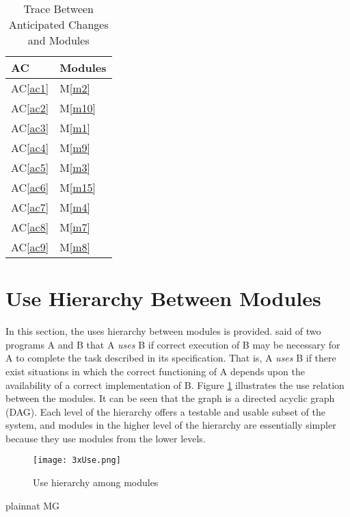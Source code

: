 \documentclass[12pt, titlepage]{article}
\newcommand{\acref}[1]{AC\ref{#1}}
\newcommand{\mref}[1]{M\ref{#1}}
\begin{document}
\begin{table}[H]
\centering
\begin{tabular}{p{} p{}}
\toprule
\textbf{AC} & \textbf{Modules}\\
\midrule
\acref{ac1} & \mref{m2}\\
\acref{ac2} & \mref{m10}\\
\acref{ac3} & \mref{m1}\\
\acref{ac4} & \mref{m9}\\
\acref{ac5} & \mref{m3}\\
\acref{ac6} & \mref{m15}\\
\acref{ac7} & \mref{m4}\\
\acref{ac8} & \mref{m7}\\
\acref{ac9} & \mref{m8}\\
\bottomrule
\end{tabular}
\caption{Trace Between Anticipated Changes and Modules}
\label{TblACT}
\end{table}
\section{Use Hierarchy Between Modules} \label{SecUse}

In this section, the uses hierarchy between modules is
provided. \citet{Parnas1978} said of two programs A and B that A {\em uses} B if
correct execution of B may be necessary for A to complete the task described in
its specification. That is, A {\em uses} B if there exist situations in which
the correct functioning of A depends upon the availability of a correct
implementation of B.  Figure \ref{FigUH} illustrates the use relation between
the modules. It can be seen that the graph is a directed acyclic graph
(DAG). Each level of the hierarchy offers a testable and usable subset of the
system, and modules in the higher level of the hierarchy are essentially simpler
because they use modules from the lower levels.

\begin{figure}[H]
\centering
\texttt{[image: 3xUse.png]}
\caption{Use hierarchy among modules}
\label{FigUH}
\end{figure}


 {plainnat}
 {MG}
\end{document}
